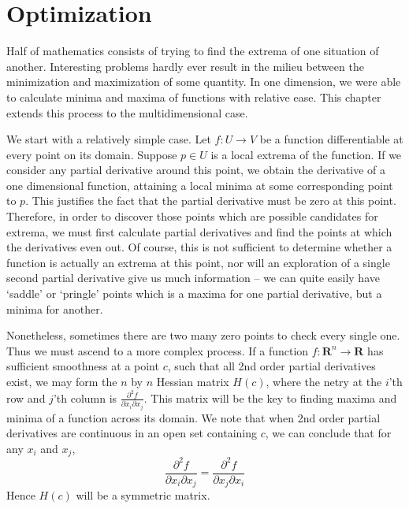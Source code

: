 \chapter{Optimization}

Half of mathematics consists of trying to find the extrema of one situation of another. Interesting problems hardly ever result in the milieu between the minimization and maximization of some quantity. In one dimension, we were able to calculate minima and maxima of functions with relative ease. This chapter extends this process to the multidimensional case.

We start with a relatively simple case. Let $f:U \to V$ be a function differentiable at every point on its domain. Suppose $p \in U$ is a local extrema of the function. If we consider any partial derivative around this point, we obtain the derivative of a one dimensional function, attaining a local minima at some corresponding point to $p$. This justifies the fact that the partial derivative must be zero at this point. Therefore, in order to discover those points which are possible candidates for extrema, we must first calculate partial derivatives and find the points at which the derivatives even out. Of course, this is not sufficient to determine whether a function is actually an extrema at this point, nor will an exploration of a single second partial derivative give us much information -- we can quite easily have `saddle' or `pringle' points which is a maxima for one partial derivative, but a minima for another.


Nonetheless, sometimes there are two many zero points to check every single one. Thus we must ascend to a more complex process. If a function $f:\mathbf{R}^n \to \mathbf{R}$ has sufficient smoothness at a point $c$, such that all 2nd order partial derivatives exist, we may form the $n$ by $n$ Hessian matrix $H(c)$, where the netry at the $i$'th row and $j$'th column is $\frac{\partial^2 f}{\partial x_i \partial x_j}$. This matrix will be the key to finding maxima and minima of a function across its domain. We note that when 2nd order partial derivatives are continuous in an open set containing $c$, we can conclude that for any $x_i$ and $x_j$,
%
\[ \frac{\partial^2 f}{\partial x_i \partial x_j} = \frac{\partial^2 f}{\partial x_j \partial x_i} \]
%
Hence $H(c)$ will be a symmetric matrix.

